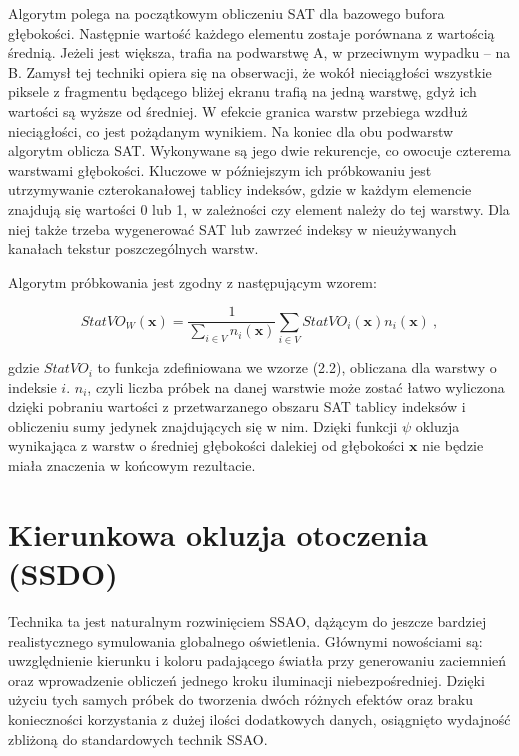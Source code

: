 		
		Algorytm polega na początkowym obliczeniu SAT dla bazowego bufora głębokości. Następnie wartość każdego elementu zostaje porównana z wartością średnią. Jeżeli jest większa, trafia na podwarstwę A, w przeciwnym wypadku -- na B. Zamysł tej techniki opiera się na obserwacji, że wokół nieciągłości wszystkie piksele z fragmentu będącego bliżej ekranu trafią na jedną warstwę, gdyż ich wartości są wyższe od średniej. W efekcie granica warstw przebiega wzdłuż nieciągłości, co jest pożądanym wynikiem. Na koniec dla obu podwarstw algorytm oblicza SAT. Wykonywane są jego dwie rekurencje, co owocuje czterema warstwami głębokości. Kluczowe w późniejszym ich próbkowaniu jest utrzymywanie czterokanałowej tablicy indeksów, gdzie w każdym elemencie znajdują się wartości 0 lub 1, w zależności czy element należy do tej warstwy. Dla niej także trzeba wygenerować SAT lub zawrzeć indeksy w nieużywanych kanałach tekstur poszczególnych warstw.
		
		Algorytm próbkowania jest zgodny z następującym wzorem:
		
		\begin{equation}
		\mathit{StatVO}_{W}(\mathbf{x}) = \frac{1}{\sum_{i \in V} n_{i}(\mathbf{x})} \sum_{i \in V}\mathit{StatVO}_{i}(\mathbf{x})n_{i}(\mathbf{x})\ ,
		\end{equation} 
		
		gdzie \(\mathit{StatVO}_{i}\) to funkcja zdefiniowana we wzorze (2.2), obliczana dla warstwy o indeksie \(i\). \(n_{i}\), czyli liczba próbek na danej warstwie może zostać łatwo wyliczona dzięki pobraniu wartości z przetwarzanego obszaru SAT tablicy indeksów i obliczeniu sumy jedynek znajdujących się w nim. Dzięki funkcji \(\psi\) okluzja wynikająca z warstw o średniej głębokości dalekiej od głębokości \(\mathbf{x}\) nie będzie miała znaczenia w końcowym rezultacie.
	
	\section{Kierunkowa okluzja otoczenia (SSDO)}
	\label{t:teoria:ssdo}
	
	Technika ta jest naturalnym rozwinięciem SSAO, dążącym do jeszcze bardziej realistycznego symulowania globalnego oświetlenia. Głównymi nowościami są: uwzględnienie kierunku i koloru padającego światła przy generowaniu zaciemnień oraz wprowadzenie obliczeń jednego kroku iluminacji niebezpośredniej. Dzięki użyciu tych samych próbek do tworzenia dwóch różnych efektów oraz braku konieczności korzystania z dużej ilości dodatkowych danych, osiągnięto wydajność zbliżoną do standardowych technik SSAO.
	
